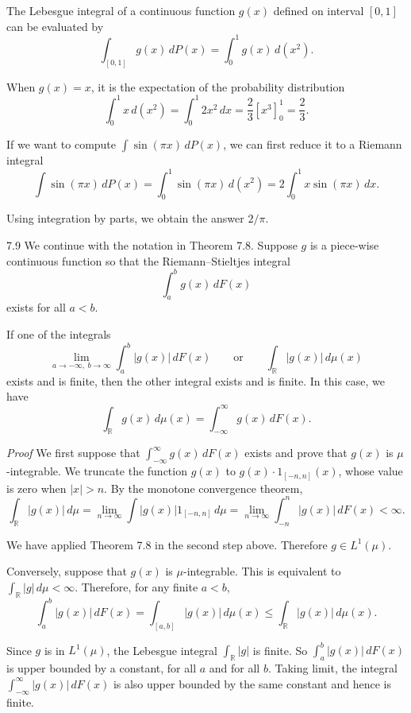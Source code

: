 The Lebesgue integral of a continuous function $g(x)$ defined on interval $[0,1]$ can be evaluated by
\[
\int_{[0,1]} g(x)\, dP(x)=\int_{0}^{1} g(x)\, d(x^2).
\]

When $g(x)=x$, it is the expectation of the probability distribution
\[
\int_{0}^{1} x\, d(x^2)=\int_{0}^{1} 2x^2\, dx = \frac{2}{3}[x^3]_0^1 = \frac{2}{3}.
\]

If we want to compute $\int \sin(\pi x)\, dP(x)$, we can first reduce it to a Riemann integral
\[
\int \sin(\pi x)\, dP(x)=\int_{0}^{1} \sin(\pi x)\, d(x^2)=2\int_{0}^{1} x\sin(\pi x)\, dx.
\]

Using integration by parts, we obtain the answer $2/\pi$.

\begin{thmbox}{7.9}
We continue with the notation in Theorem 7.8. Suppose $g$ is a piece-wise continuous function so that the Riemann--Stieltjes integral
\[
\int_a^b g(x)\, dF(x)
\]
exists for all $a<b$.

If one of the integrals
\begin{equation}
\lim_{a\to-\infty,\ b\to\infty} \int_a^b |g(x)|\, dF(x)
\qquad \text{or} \qquad
\int_{\mathbb{R}} |g(x)|\, d\mu(x)
\tag{7.4}
\end{equation}
exists and is finite, then the other integral exists and is finite. In this case, we have
\begin{equation}
\int_{\mathbb{R}} g(x)\, d\mu(x)=\int_{-\infty}^{\infty} g(x)\, dF(x).
\tag{7.5}
\end{equation}
\end{thmbox}

\textit{Proof} We first suppose that $\int_{-\infty}^{\infty} g(x)\, dF(x)$ exists and prove that $g(x)$ is $\mu$-integrable. We truncate the function $g(x)$ to $g(x)\cdot 1_{[-n,n]}(x)$, whose value is zero when $|x|>n$. By the monotone convergence theorem,
\[
\int_{\mathbb{R}} |g(x)|\, d\mu
=
\lim_{n\to\infty} \int |g(x)|1_{[-n,n]}\, d\mu
=
\lim_{n\to\infty} \int_{-n}^{n} |g(x)|\, dF(x)
<\infty.
\]

We have applied Theorem 7.8 in the second step above. Therefore $g\in L^1(\mu)$.

Conversely, suppose that $g(x)$ is $\mu$-integrable. This is equivalent to $\int_{\mathbb{R}} |g|\, d\mu < \infty$. Therefore, for any finite $a<b$,
\[
\int_a^b |g(x)|\, dF(x)
=
\int_{[a,b]} |g(x)|\, d\mu(x)
\le
\int_{\mathbb{R}} |g(x)|\, d\mu(x).
\]

Since $g$ is in $L^1(\mu)$, the Lebesgue integral $\int_{\mathbb{R}} |g|$ is finite. So $\int_a^b |g(x)|\, dF(x)$ is upper bounded by a constant, for all $a$ and for all $b$. Taking limit, the integral $\int_{-\infty}^{\infty} |g(x)|\, dF(x)$ is also upper bounded by the same constant and hence is finite.

